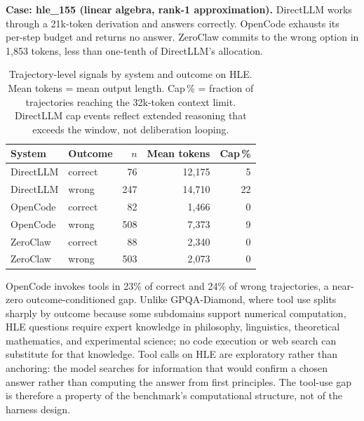 \textbf{Case: hle\_155 (linear algebra, rank-1 approximation).}
DirectLLM works through a 21k-token derivation and answers correctly.
OpenCode exhausts its per-step budget and returns no answer.
ZeroClaw commits to the wrong option in 1,853 tokens, less than one-tenth of
DirectLLM's allocation.

\begin{table}[t]
\centering
\small
\caption{%
  Trajectory-level signals by system and outcome on HLE.
  Mean tokens = mean output length.
  Cap\,\% = fraction of trajectories reaching the 32k-token context limit.
  DirectLLM cap events reflect extended reasoning that exceeds the window, not
  deliberation looping.
}
\label{tab:hle-goal-loss}
\setlength{\tabcolsep}{4pt}
\begin{tabular}{llrrr}
\toprule
System & Outcome & $n$ & Mean tokens & Cap\,\% \\
\midrule
DirectLLM & correct &  76 & 12{,}175 &  5 \\
DirectLLM & wrong   & 247 & 14{,}710 & 22 \\
\midrule
OpenCode  & correct &  82 &  1{,}466 &  0 \\
OpenCode  & wrong   & 508 &  7{,}373 &  9 \\
\midrule
ZeroClaw  & correct &  88 &  2{,}340 &  0 \\
ZeroClaw  & wrong   & 503 &  2{,}073 &  0 \\
\bottomrule
\end{tabular}
\end{table}


OpenCode invokes tools in 23\% of correct and 24\% of wrong trajectories,
a near-zero outcome-conditioned gap.
Unlike GPQA-Diamond, where tool use splits sharply by outcome because some
subdomains support numerical computation, HLE questions require expert
knowledge in philosophy, linguistics, theoretical mathematics, and
experimental science; no code execution or web search can substitute for
that knowledge.
Tool calls on HLE are exploratory rather than anchoring: the model searches
for information that would confirm a chosen answer rather than computing the
answer from first principles.
The tool-use gap is therefore a property of the benchmark's computational
structure, not of the harness design.


